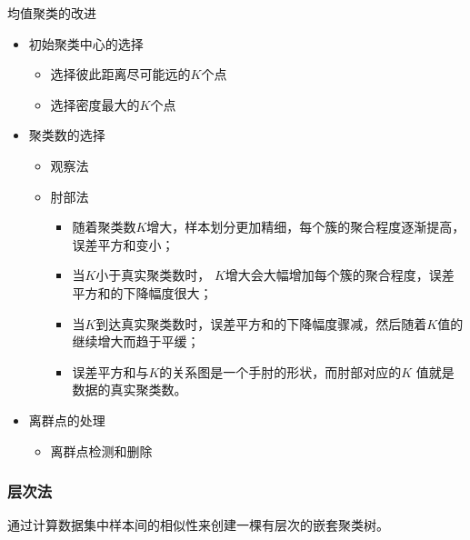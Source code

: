 \begin{note}
    均值聚类的改进
    \begin{itemize}
        \item 初始聚类中心的选择
        \begin{itemize}
            \item 选择彼此距离尽可能远的$K $个点
            \item 选择密度最大的$K $个点
        \end{itemize}
        \item 聚类数的选择
        \begin{itemize}
            \item 观察法
            \item 肘部法
            \begin{itemize}
                \item 随着聚类数$K $增大，样本划分更加精细，每个簇的聚合程度逐渐提高，误差平方和变小；
                \item 当$K $小于真实聚类数时， $K $增大会大幅增加每个簇的聚合程度，误差平方和的下降幅度很大；
                \item 当$K $到达真实聚类数时，误差平方和的下降幅度骤减，然后随着$K $值的继续增大而趋于平缓；
                \item 误差平方和与$K $的关系图是一个手肘的形状，而肘部对应的$K $ 值就是数据的真实聚类数。
            \end{itemize}
        \end{itemize}
        \item 离群点的处理
        \begin{itemize}
            \item 离群点检测和删除
        \end{itemize}
    \end{itemize}
\end{note}
\subsubsection{层次法}
\begin{definition}[层次聚类方法]
    通过计算数据集中样本间的相似性来创建一棵有层次的嵌套聚类树。
\end{definition}

